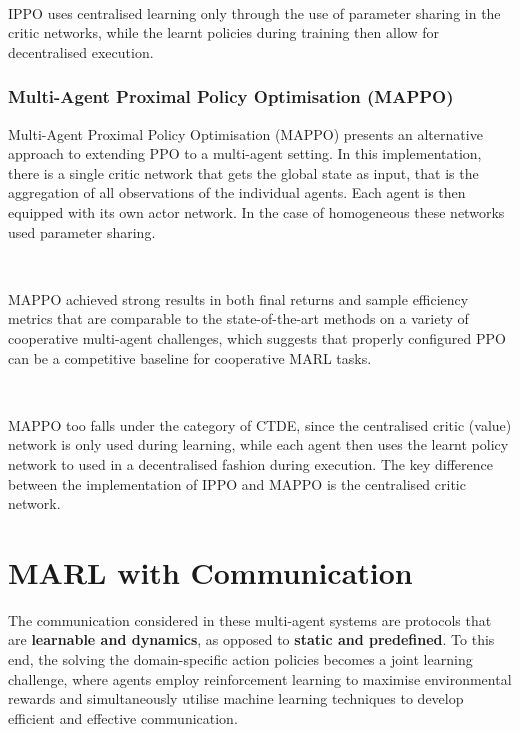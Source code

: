 \documentclass{article}
\begin{document}
\

IPPO uses centralised learning only through the use of parameter sharing in the critic networks, while the learnt policies during training then allow for decentralised execution.

\subsubsection{Multi-Agent Proximal Policy Optimisation (MAPPO)}

Multi-Agent Proximal Policy Optimisation (MAPPO) \citep{chao2021surprising} presents an alternative approach to extending PPO to a multi-agent setting. In this implementation, there is a single critic network that gets the global state as input, that is the aggregation of all observations of the individual agents. Each agent is then equipped with its own actor network. In the case of homogeneous these networks used parameter sharing.

\

MAPPO achieved strong results in both final returns and sample efficiency metrics that are comparable to the state-of-the-art methods on a variety of cooperative multi-agent challenges, which suggests that properly configured PPO can be a competitive baseline for cooperative MARL tasks. \citep{chao2021surprising}

\

MAPPO too falls under the category of CTDE, since the centralised critic (value) network is only used during learning, while each agent then uses the learnt policy network to used in a decentralised fashion during execution. The key difference between the implementation of IPPO and MAPPO is the centralised critic network.

\newpage

\section{MARL with Communication}


The communication considered in these multi-agent systems are protocols that are \textbf{learnable and dynamics}, as opposed to \textbf{static and predefined}. To this end, the solving the domain-specific action policies becomes a joint learning challenge, where agents employ reinforcement learning to maximise environmental rewards and simultaneously utilise machine learning techniques to develop efficient and effective communication. \citep{zhu2024survey}
\end{document}
